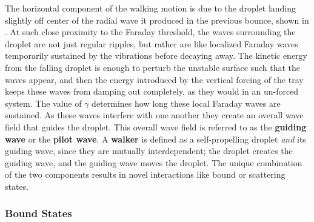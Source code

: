  
The horizontal component of the walking motion is due to the droplet landing slightly off center of the radial wave it produced in the previous bounce, shown in . At such close proximity to the Faraday threshold, the waves surrounding the droplet are not just regular ripples, but rather are like localized Faraday waves temporarily sustained by the vibrations before decaying away. The kinetic energy from the falling droplet is enough to perturb the unstable surface such that the waves appear, and then the energy introduced by the vertical forcing of the tray keeps these waves from damping out completely, as they would in an un-forced system. The value of $\gamma$ determines how long these local Faraday waves are sustained. As these waves interfere with one another they create an overall wave field that guides the droplet. This overall wave field is referred to as the \textbf{guiding wave} or the \textbf{pilot wave}. A \textbf{walker} is defined as a self-propelling droplet \textit{and} its guiding wave, since they are mutually interdependent; the droplet creates the guiding wave, and the guiding wave moves the droplet. The unique combination of the two components results in novel interactions like bound or scattering states.



 \subsubsection{Bound States}


